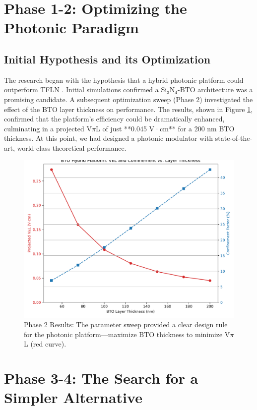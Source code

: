 \documentclass{article}
\begin{document}
\section{Phase 1-2: Optimizing the Photonic Paradigm}
\subsection{Initial Hypothesis and its Optimization}
The research began with the hypothesis that a hybrid photonic platform could outperform TFLN \cite{TFLNreview}. Initial simulations confirmed a Si$_3$N$_4$-BTO \cite{SiN, BTO} architecture was a promising candidate. A subsequent optimization sweep (Phase 2) investigated the effect of the BTO layer thickness on performance. The results, shown in Figure \ref{fig:sweep}, confirmed that the platform's efficiency could be dramatically enhanced, culminating in a projected V$\pi$L of just **0.045 V·cm** for a 200 nm BTO thickness. At this point, we had designed a photonic modulator with state-of-the-art, world-class theoretical performance.

\begin{figure}[H]
    \centering
    \includegraphics[width=0.9\linewidth]{simulation_v2_optimization_sweep.pdf}
    \caption{Phase 2 Results: The parameter sweep provided a clear design rule for the photonic platform—maximize BTO thickness to minimize V$\pi$L (red curve).}
    \label{fig:sweep}
\end{figure}

\section{Phase 3-4: The Search for a Simpler Alternative}
\end{document}
